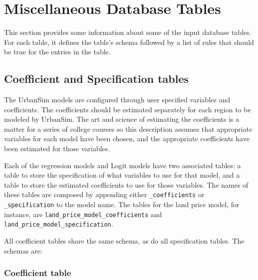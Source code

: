 \section{Miscellaneous Database Tables}

This section provides some information about some of the input database tables.
For each table, it defines the table's schema followed by a list of rules that
should be true for the entries in the table.

\subsection{Coefficient and Specification tables}

The UrbanSim models are configured through user specified
variables and coefficients. The coefficients should be
estimated separately for each region to be modeled by UrbanSim. The art and
science of estimating the coefficients is a matter for a series of college
courses so this description assumes that appropriate variables for each model
have been chosen, and the appropriate coefficients have been estimated for
those variables.

Each of the regression models and Logit models have two associated
tables: a table to store the specification of what variables to use
for that model, and a table to store the estimated coefficients to
use for those variables.  The names of these tables are composed by
appending either \verb|_coefficients| or \verb|_specification| to
the model name.  The tables for the land price model, for instance,
are \verb|land_price_model_coefficients| and
\verb|land_price_model_specification|.

All coefficient tables share the same schema, as do all
specification tables. The schemas are:

\subsubsection{Coefficient table}


